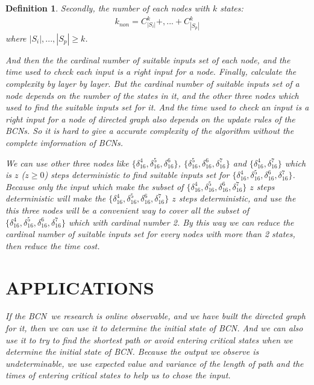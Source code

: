 \documentclass[conference]{IEEEtran} %
\newtheorem{definition}{Definition}
\def \BCN {{\em BCN}}
\begin{document}
\begin{definition}
Secondly, the number of each nodes with $k$ states:
\begin{equation}
\begin{split}
k_{non}= C_{|S_i|}^k+,...+C_{|S_p|}^k
\end{split}
\end{equation}
where $|S_i|,...,|S_p|\ge k$.

And then the the cardinal number of suitable inputs set of each node, and the time used to check each input is a right input for a node. Finally, calculate the complexity by layer by layer. But the cardinal number of suitable inputs set of a node depends on the number of the states in it, and the other three nodes which used to find the suitable inputs set for it. And the time used to check an input is a right input for  a node of directed graph also depends on the update rules of the {\em BCNs}. So it is hard to give a accurate complexity of the algorithm without the complete imformation of {\em BCNs}.

We can use other three nodes like $\{\delta_{16}^4,\delta_{16}^5,\delta_{16}^6\}$, $\{\delta_{16}^5,\delta_{16}^6,\delta_{16}^7\}$ and $\{\delta_{16}^4,\delta_{16}^7\}$ which is $z$ ($z\ge0$) steps deterministic to find suitable inputs set for $\{\delta_{16}^4,\delta_{16}^5,\delta_{16}^6,\delta_{16}^7\}$. Because only the input which make the subset of $\{\delta_{16}^4,\delta_{16}^5,\delta_{16}^6,\delta_{16}^7\}$ $z$ steps deterministic will make the $\{\delta_{16}^4,\delta_{16}^5,\delta_{16}^6,\delta_{16}^7\}$ $z$ steps deterministic, and use the this three nodes will be a convenient way to cover all the subset of $\{\delta_{16}^4,\delta_{16}^5,\delta_{16}^6,\delta_{16}^7\}$ which with cardinal number 2. By this way we can  reduce the cardinal number of suitable inputs set for every nodes with more than 2 states, then reduce the time cost. 



\section{APPLICATIONS}

If the \BCN\ we research is online observable, and we have built the directed graph for it, then we can use  it to determine the initial state of {\em BCN}. And we can also use it to try to find the shortest path or avoid entering critical states when we determine the initial state of {\em BCN}. Because the output we observe is undeterminable, we use expected value and variance of the length of path and the times of entering critical states to help us to chose the input.


\end{definition}
\end{document}
